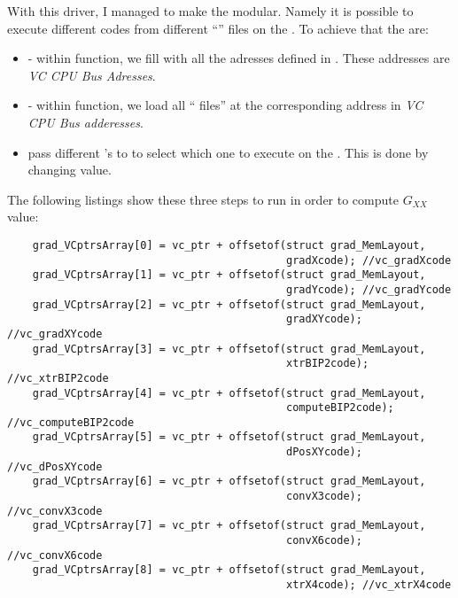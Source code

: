 With this driver, I managed to make the \api{} modular. Namely it is possible to execute different codes from different \enquote{} files on the \vc.
To achieve that the  are:

\begin{itemize}
	\item {} - within  function, we fill  with all the adresses defined in . These addresses are \emph{VC CPU Bus Adresses}.
	\item {} - within  function, we load all \enquote{ files} at the corresponding address in \emph{VC CPU Bus adderesses}.
	\item pass different 's  to  to select which one to execute on the \vc. This is done by changing  value.
\end{itemize}

The following listings show these three steps to run  in order to compute $G_{XX}$ value:

\begin{lstlisting}
    grad_VCptrsArray[0] = vc_ptr + offsetof(struct grad_MemLayout,
                                            gradXcode); //vc_gradXcode
    grad_VCptrsArray[1] = vc_ptr + offsetof(struct grad_MemLayout,
                                            gradYcode); //vc_gradYcode
    grad_VCptrsArray[2] = vc_ptr + offsetof(struct grad_MemLayout,
                                            gradXYcode); //vc_gradXYcode
    grad_VCptrsArray[3] = vc_ptr + offsetof(struct grad_MemLayout,
                                            xtrBIP2code); //vc_xtrBIP2code
    grad_VCptrsArray[4] = vc_ptr + offsetof(struct grad_MemLayout,
                                            computeBIP2code); //vc_computeBIP2code
    grad_VCptrsArray[5] = vc_ptr + offsetof(struct grad_MemLayout,
                                            dPosXYcode); //vc_dPosXYcode
    grad_VCptrsArray[6] = vc_ptr + offsetof(struct grad_MemLayout,
                                            convX3code); //vc_convX3code
    grad_VCptrsArray[7] = vc_ptr + offsetof(struct grad_MemLayout,
                                            convX6code); //vc_convX6code
    grad_VCptrsArray[8] = vc_ptr + offsetof(struct grad_MemLayout,
                                            xtrX4code); //vc_xtrX4code
\end{lstlisting}
\newpage


